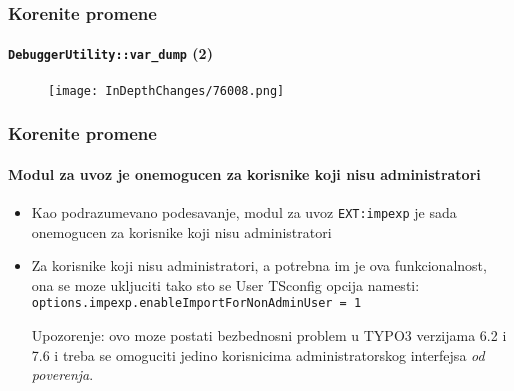 \begin{frame}[fragile]
	\frametitle{Korenite promene}
	\framesubtitle{\texttt{DebuggerUtility::var\_dump} (2)}

	\begin{figure}
		\texttt{[image: InDepthChanges/76008.png]}
	\end{figure}

\end{frame}

\begin{frame}[fragile]
	\frametitle{Korenite promene}
	\framesubtitle{Modul za uvoz je onemogucen za korisnike koji nisu administratori}

	\begin{itemize}

		\item Kao podrazumevano podesavanje, modul za uvoz \texttt{EXT:impexp} je sada onemogucen 
			za korisnike koji nisu administratori

		\item Za korisnike koji nisu administratori, a potrebna im je ova funkcionalnost, 
			ona se moze ukljuciti tako sto se User TSconfig opcija namesti:\newline
			\texttt{options.impexp.enableImportForNonAdminUser = 1}

			\vspace{0.5cm}

			\begingroup
				\color{typo3red}
				Upozorenje: ovo moze postati bezbednosni problem u TYPO3 verzijama 6.2 i 7.6
				i treba se omoguciti jedino korisnicima administratorskog interfejsa \textit{ od poverenja}.
			\endgroup

	\end{itemize}

\end{frame}

